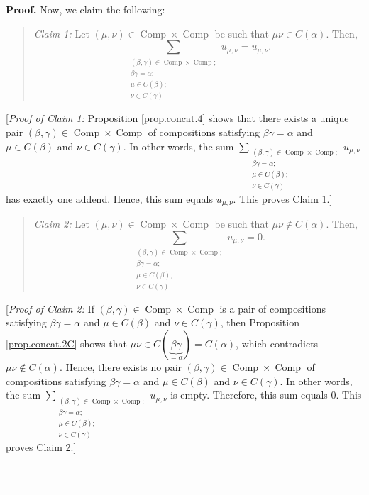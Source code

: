 \documentclass[numbers=enddot,12pt,final,onecolumn,notitlepage]{scrartcl}%
\theoremstyle{definition}
\newenvironment{statement}{\begin{quote}}{\end{quote}}
\newenvironment{proof}[1][Proof]{\noindent\textbf{#1.} }{\ \rule{0.5em}{0.5em}}
\let\sumnonlimits\sum
\renewcommand{\sum}{\sumnonlimits\limits}
\begin{document}
\begin{proof}
Now, we claim the following:

\begin{statement}
\textit{Claim 1:} Let $\left(  \mu,\nu\right)  \in\operatorname*{Comp}%
\times\operatorname*{Comp}$ be such that $\mu\nu\in C\left(  \alpha\right)  $.
Then,
\[
\sum_{\substack{\left(  \beta,\gamma\right)  \in\operatorname*{Comp}%
\times\operatorname*{Comp};\\\beta\gamma=\alpha;\\\mu\in C\left(
\beta\right)  ;\\\nu\in C\left(  \gamma\right)  }}u_{\mu,\nu}=u_{\mu,\nu}.
\]

\end{statement}

[\textit{Proof of Claim 1:} Proposition \ref{prop.concat.4} shows that there
exists a unique pair $\left(  \beta,\gamma\right)  \in\operatorname*{Comp}%
\times\operatorname*{Comp}$ of compositions satisfying $\beta\gamma=\alpha$
and $\mu\in C\left(  \beta\right)  $ and $\nu\in C\left(  \gamma\right)  $. In
other words, the sum $\sum_{\substack{\left(  \beta,\gamma\right)
\in\operatorname*{Comp}\times\operatorname*{Comp};\\\beta\gamma=\alpha
;\\\mu\in C\left(  \beta\right)  ;\\\nu\in C\left(  \gamma\right)  }%
}u_{\mu,\nu}$ has exactly one addend. Hence, this sum equals $u_{\mu,\nu}$.
This proves Claim 1.]

\begin{statement}
\textit{Claim 2:} Let $\left(  \mu,\nu\right)  \in\operatorname*{Comp}%
\times\operatorname*{Comp}$ be such that $\mu\nu\notin C\left(  \alpha\right)
$. Then,
\[
\sum_{\substack{\left(  \beta,\gamma\right)  \in\operatorname*{Comp}%
\times\operatorname*{Comp};\\\beta\gamma=\alpha;\\\mu\in C\left(
\beta\right)  ;\\\nu\in C\left(  \gamma\right)  }}u_{\mu,\nu}=0.
\]

\end{statement}

[\textit{Proof of Claim 2:} If $\left(  \beta,\gamma\right)  \in
\operatorname*{Comp}\times\operatorname*{Comp}$ is a pair of compositions
satisfying $\beta\gamma=\alpha$ and $\mu\in C\left(  \beta\right)  $ and
$\nu\in C\left(  \gamma\right)  $, then Proposition \ref{prop.concat.2C} shows
that $\mu\nu\in C\left(  \underbrace{\beta\gamma}_{=\alpha}\right)  =C\left(
\alpha\right)  $, which contradicts $\mu\nu\notin C\left(  \alpha\right)  $.
Hence, there exists no pair $\left(  \beta,\gamma\right)  \in
\operatorname*{Comp}\times\operatorname*{Comp}$ of compositions satisfying
$\beta\gamma=\alpha$ and $\mu\in C\left(  \beta\right)  $ and $\nu\in C\left(
\gamma\right)  $. In other words, the sum $\sum_{\substack{\left(
\beta,\gamma\right)  \in\operatorname*{Comp}\times\operatorname*{Comp}%
;\\\beta\gamma=\alpha;\\\mu\in C\left(  \beta\right)  ;\\\nu\in C\left(
\gamma\right)  }}u_{\mu,\nu}$ is empty. Therefore, this sum equals $0$. This
proves Claim 2.]


\end{proof}
\end{document}
